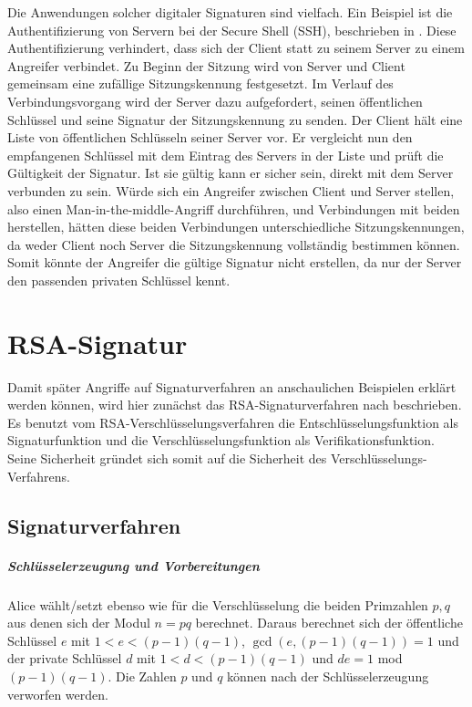 \documentclass[a4paper,12pt,oneside]{scrreprt}
\begin{document}
Die Anwendungen solcher digitaler Signaturen sind vielfach. Ein Beispiel ist die Authentifizierung von Servern bei der Secure Shell (SSH), beschrieben in \cite{barrett2005ssh}. Diese Authentifizierung verhindert, dass sich der Client statt zu seinem Server zu einem Angreifer verbindet. Zu Beginn der Sitzung wird von Server und Client gemeinsam eine zufällige Sitzungskennung festgesetzt. Im Verlauf des Verbindungsvorgang wird der Server dazu aufgefordert, seinen öffentlichen Schlüssel und seine Signatur der Sitzungskennung zu senden. Der Client hält eine Liste von öffentlichen Schlüsseln seiner Server vor. Er vergleicht nun den empfangenen Schlüssel mit dem Eintrag des Servers in der Liste und prüft die Gültigkeit der Signatur. Ist sie gültig kann er sicher sein, direkt mit dem Server verbunden zu sein. Würde sich ein Angreifer zwischen Client und Server stellen, also einen Man-in-the-middle-Angriff durchführen, und Verbindungen mit beiden herstellen, hätten diese beiden Verbindungen 
unterschiedliche Sitzungskennungen, da weder Client noch Server die Sitzungskennung vollständig bestimmen können. Somit könnte der Angreifer die gültige Signatur nicht erstellen, da nur der Server den passenden privaten Schlüssel kennt. 





\chapter{RSA-Signatur}

Damit später Angriffe auf Signaturverfahren an anschaulichen Beispielen erklärt werden können, wird hier zunächst das RSA-Signaturverfahren nach \cite{Rivest78amethod} beschrieben. Es benutzt vom RSA-Verschlüsselungsverfahren die Entschlüsselungsfunktion als Signaturfunktion und die Verschlüsselungsfunktion als Verifikationsfunktion. Seine Sicherheit gründet sich somit auf die Sicherheit des Verschlüsselungs-Verfahrens. 

\section{Signaturverfahren}

\paragraph{Schlüsselerzeugung und Vorbereitungen}

Alice wählt/setzt ebenso wie für die Verschlüsselung die beiden Primzahlen $p, q$ aus denen sich der Modul $n = pq$ berechnet. Daraus berechnet sich der öffentliche Schlüssel $e$ mit $1 < e < (p-1)(q-1)$, $\gcd(e,(p-1)(q-1)) = 1$ und der private Schlüssel $d$ mit $1 < d < (p-1)(q-1)$ und $de = 1$ mod $(p-1)(q-1)$. Die Zahlen $p$ und $q$ können nach der Schlüsselerzeugung verworfen werden. 
\end{document}
